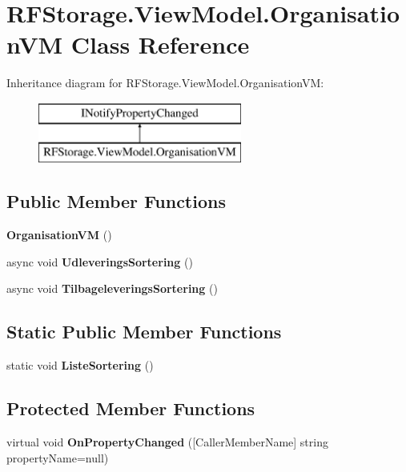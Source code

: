 \section{R\+F\+Storage.\+View\+Model.\+Organisation\+VM Class Reference}
\label{class_r_f_storage_1_1_view_model_1_1_organisation_v_m}
Inheritance diagram for R\+F\+Storage.\+View\+Model.\+Organisation\+VM\+:\begin{figure}[H]
\begin{center}
\leavevmode
\includegraphics[height=2.000000cm]{class_r_f_storage_1_1_view_model_1_1_organisation_v_m}
\end{center}
\end{figure}
\subsection*{Public Member Functions}
\begin{DoxyCompactItemize}
\item 
\textbf{ Organisation\+VM} ()
\item 
async void \textbf{ Udleverings\+Sortering} ()
\item 
async void \textbf{ Tilbageleverings\+Sortering} ()
\end{DoxyCompactItemize}
\subsection*{Static Public Member Functions}
\begin{DoxyCompactItemize}
\item 
static void \textbf{ Liste\+Sortering} ()
\end{DoxyCompactItemize}
\subsection*{Protected Member Functions}
\begin{DoxyCompactItemize}
\item 
\mbox{\label{class_r_f_storage_1_1_view_model_1_1_organisation_v_m_ac9014971098fd910399449d2f0797d0c}} 
virtual void {\bfseries On\+Property\+Changed} ([Caller\+Member\+Name] string property\+Name=null)
\end{DoxyCompactItemize}
